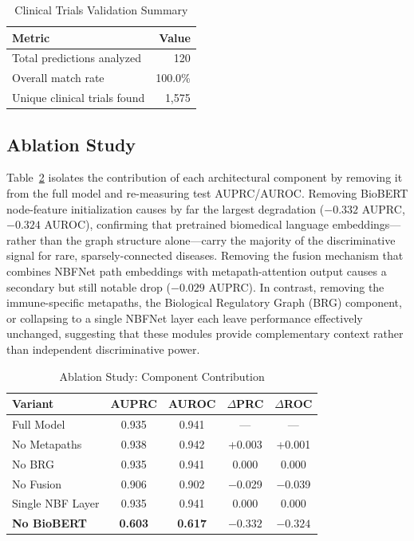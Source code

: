 \documentclass[conference]{IEEEtran}
\begin{document}
\begin{table}[!t]
\caption{Clinical Trials Validation Summary}
\label{tab:clinical}
\centering
\footnotesize
\renewcommand{\arraystretch}{1.4}
\begin{tabular}{p{3.5cm}r}
\toprule
\textbf{Metric} & \textbf{Value} \\
\midrule
Total predictions analyzed & 120 \\
Overall match rate & 100.0\% \\
Unique clinical trials found & 1,575 \\
\bottomrule
\end{tabular}
\end{table}

\subsection{Ablation Study}

Table~\ref{tab:ablation} isolates the contribution of each architectural component by removing it from the full model and re-measuring test AUPRC/AUROC. Removing BioBERT node-feature initialization causes by far the largest degradation ($-0.332$ AUPRC, $-0.324$ AUROC), confirming that pretrained biomedical language embeddings---rather than the graph structure alone---carry the majority of the discriminative signal for rare, sparsely-connected diseases. Removing the fusion mechanism that combines NBFNet path embeddings with metapath-attention output causes a secondary but still notable drop ($-0.029$ AUPRC). In contrast, removing the immune-specific metapaths, the Biological Regulatory Graph (BRG) component, or collapsing to a single NBFNet layer each leave performance effectively unchanged, suggesting that these modules provide complementary context rather than independent discriminative power.

\begin{table}[!t]
\caption{Ablation Study: Component Contribution}
\label{tab:ablation}
\centering
\footnotesize
\renewcommand{\arraystretch}{1.4}
\begin{tabular}{p{2.5cm}cccc}
\toprule
\textbf{Variant} & \textbf{AUPRC} & \textbf{AUROC} & $\Delta$\textbf{PRC} & $\Delta$\textbf{ROC} \\
\midrule
Full Model & 0.935 & 0.941 & --- & --- \\
No Metapaths & 0.938 & 0.942 & +0.003 & +0.001 \\
No BRG & 0.935 & 0.941 & 0.000 & 0.000 \\
No Fusion & 0.906 & 0.902 & $-$0.029 & $-$0.039 \\
Single NBF Layer & 0.935 & 0.941 & 0.000 & 0.000 \\
\textbf{No BioBERT} & \textbf{0.603} & \textbf{0.617} & $\mathbf{-0.332}$ & $\mathbf{-0.324}$ \\
\bottomrule
\end{tabular}
\end{table}
\end{document}
